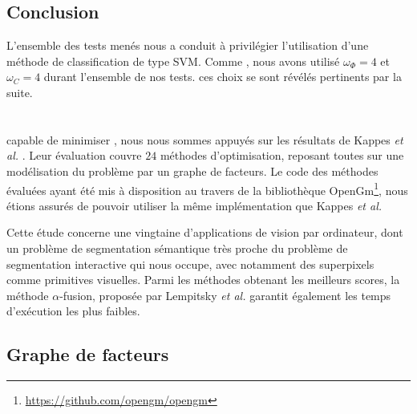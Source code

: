\subsection{Conclusion}

L'ensemble des tests menés nous a conduit à privilégier l'utilisation d'une méthode de classification de type SVM. Comme , nous avons utilisé $\omega_{\Phi}=4$ et $\omega_{C}=4$ durant l'ensemble de nos tests.  ces choix se sont révélés pertinents par la suite.


\section{}


 capable de minimiser , nous nous sommes appuyés sur les résultats de Kappes \textit{et al.} \cite{kappes2013comparative}. Leur évaluation couvre $24$ méthodes d'optimisation, reposant toutes sur une modélisation du problème par un graphe de facteurs. Le code des méthodes évaluées ayant été mis à disposition au travers de la bibliothèque OpenGm\footnote{\url{https://github.com/opengm/opengm}}, nous étions assurés de pouvoir utiliser la même implémentation que Kappes \textit{et al.}


Cette étude concerne une vingtaine d'applications de vision par ordinateur, dont un problème de segmentation sémantique très proche du problème de segmentation interactive qui nous occupe, avec notamment des superpixels comme primitives visuelles. Parmi les méthodes obtenant les meilleurs scores, la méthode $\alpha$-fusion, proposée par Lempitsky \textit{et al.} \cite{lempitsky2010fusion} garantit également les temps d'exécution les plus faibles. 

\label{sec:saf:opt}
\subsection{Graphe de facteurs}

